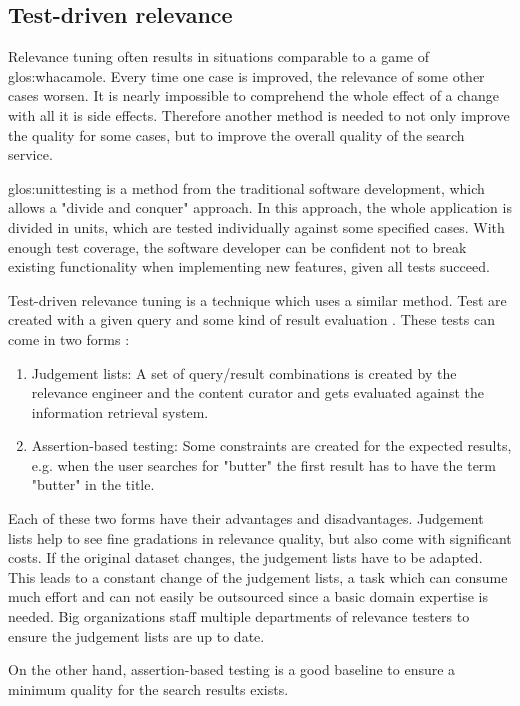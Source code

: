 \subsection{Test-driven relevance}
\label{ref:qa:orga:tdr}
Relevance tuning often results in situations comparable to a game of \gls{glos:whacamole}.
Every time one case is improved, the relevance of some other cases worsen.
It is nearly impossible to comprehend the whole effect of a change with all it is side effects.
Therefore another method is needed to not only improve the quality for some cases,
but to improve the overall quality of the search service.
\par
\gls{glos:unittesting} is a method from the traditional software development,
which allows a "divide and conquer" approach.
In this approach, the whole application is divided in units,
which are tested individually against some specified cases.
With enough test coverage, the software developer can be confident not to break existing functionality
when implementing new features, given all tests succeed.
\par
Test-driven relevance tuning is a technique which uses a similar method.
Test are created with a given query and some kind of result evaluation \cite[see][P. 272]{relevant_search_2016}.
These tests can come in two forms \cite[see][P. 273]{relevant_search_2016}:
\begin{enumerate}
	\item Judgement lists: A set of query/result combinations is created by the relevance engineer 
	      and the content curator and gets evaluated against the information retrieval system.
	\item Assertion-based testing: Some constraints are created for the expected results, 
	      e.g. when the user searches for "butter" the first result has to have the term "butter" in the title.
\end{enumerate}
Each of these two forms have their advantages and disadvantages.
Judgement lists help to see fine gradations in relevance quality, but also come with significant costs.
If the original dataset changes, the judgement lists have to be adapted. 
This leads to a constant change of the judgement lists, a task which can consume much effort and can not easily be outsourced since a basic domain expertise is needed.
Big organizations staff multiple departments of relevance testers to ensure the judgement lists are up to date\cite[see][section Evaluators]{google_search_2021}.\par
On the other hand, assertion-based testing is a good baseline to ensure a minimum quality for the search results exists.

